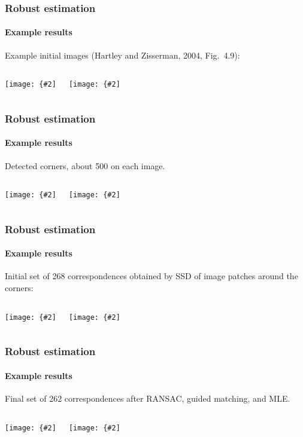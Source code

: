 \documentclass[aspectratio=169]{beamer}
\newcommand{\mat}[1]{\mathtt{#1}}
\newcommand{\myfig}[3]{\centerline{\texttt{[image: \{\#2]}}}
\begin{document}
\begin{frame}
\frametitle{Robust estimation}
\framesubtitle{Example results}

Example initial images (Hartley and Zisserman, 2004, Fig.\ 4.9):

\medskip

\begin{columns}[T]
\column{2.25in}
\myfig{2.2in}{HZ-fig3-9a}{Image 1}
\column{2.25in}
\myfig{2.2in}{HZ-fig3-9b}{\parbox{2in}{Image 2, related by rotation
    around camera center}}
\end{columns}

\end{frame}

\begin{frame}
\frametitle{Robust estimation}
\framesubtitle{Example results}

Detected corners, about 500 on each image.

\begin{columns}[T]
\column{2.25in}
\myfig{2.2in}{HZ-fig3-9c}{}
\column{2.25in}
\myfig{2.2in}{HZ-fig3-9d}{}
\end{columns}

\end{frame}

\begin{frame}
\frametitle{Robust estimation}
\framesubtitle{Example results}

Initial set of 268 correspondences obtained by SSD of image patches
around the corners:

\medskip

\begin{columns}[T]
  \column{2.25in} \myfig{2.2in}{HZ-fig3-9e}{\parbox{2in}{268 putative
      correspondences, Hartley and Zisserman (2004), Fig.\ 4.9(e)}}
  \column{2.25in} \myfig{2.2in}{HZ-fig3-9f}{\parbox{2in}{117/268
      outliers, Hartley and Zisserman (2004), Fig.\ 4.9(f)}}
\end{columns}

\end{frame}

\begin{frame}
\frametitle{Robust estimation}
\framesubtitle{Example results}

Final set of 262 correspondences after RANSAC, guided matching, and MLE.

\medskip

\begin{columns}[T]
  \column{2.25in} \myfig{2.2in}{HZ-fig3-9g}{\parbox{2in}{151 inliers
      consistent with $\mat{H}$ found by RANSAC, Hartley and Zisserman
      (2004), Fig.\ 4.9(g).}}  \column{2.25in}
  \myfig{2.2in}{HZ-fig3-9h}{\parbox{2in}{Final set of 262
      correspondences after guided matching and MLE beginning from the
      RANSAC solution, Hartley and Zisserman (2004), Fig.\ 4.9(h).}}
\end{columns}

\end{frame}
\end{document}
